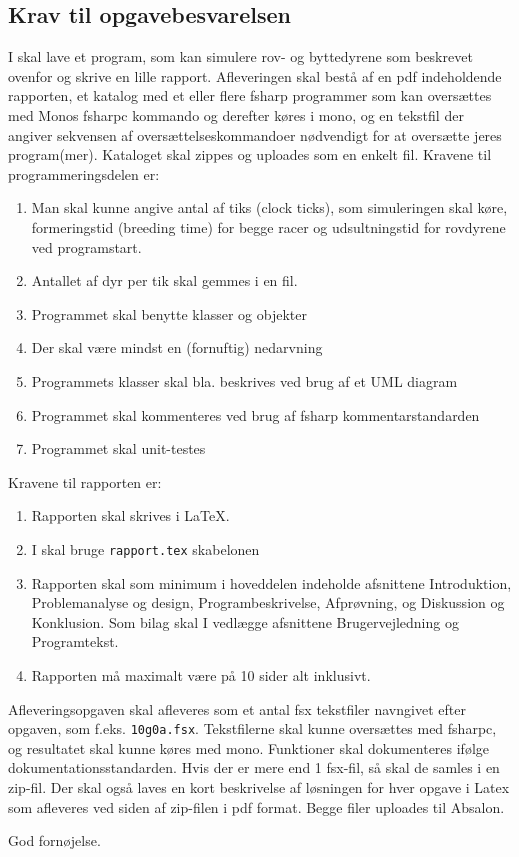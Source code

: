 \documentclass[a4paper,12pt]{article}
\begin{document}
\subsection*{Krav til opgavebesvarelsen}
I skal lave et program, som kan simulere rov- og byttedyrene som beskrevet ovenfor og skrive en lille rapport. Afleveringen skal bestå af en pdf indeholdende rapporten, et katalog med et eller flere fsharp programmer som kan oversættes med Monos fsharpc kommando og derefter køres i mono, og en tekstfil der angiver sekvensen af oversættelseskommandoer nødvendigt for at oversætte jeres program(mer). Kataloget skal zippes og uploades som en enkelt fil. Kravene til programmeringsdelen er:
\begin{enumerate}
\item Man skal kunne angive antal af tiks (clock ticks), som simuleringen skal køre, formeringstid (breeding time) for begge racer og udsultningstid for rovdyrene ved programstart.
\item Antallet af dyr per tik skal gemmes i en fil.
\item Programmet skal benytte klasser og objekter
\item Der skal være mindst en (fornuftig) nedarvning
\item Programmets klasser skal bla. beskrives ved brug af et UML diagram
\item Programmet skal kommenteres ved brug af fsharp kommentarstandarden
\item Programmet skal unit-testes
\end{enumerate}
Kravene til rapporten er:
\begin{enumerate}[resume]
\item Rapporten skal skrives i \LaTeX.
\item I skal bruge \texttt{rapport.tex} skabelonen
\item Rapporten skal som minimum i hoveddelen indeholde afsnittene Introduktion, Problemanalyse og design, Programbeskrivelse, Afprøvning, og Diskussion og Konklusion. Som bilag skal I vedlægge afsnittene Brugervejledning og Programtekst.
\item Rapporten må maximalt være på 10 sider alt inklusivt.
\end{enumerate}
 
Afleveringsopgaven skal afleveres som et antal fsx tekstfiler navngivet efter opgaven, som f.eks. \lstinline!10g0a.fsx!. Tekstfilerne skal kunne oversættes med fsharpc, og resultatet skal kunne køres med mono. Funktioner skal dokumenteres ifølge dokumentationsstandarden. Hvis der er mere end 1 fsx-fil, så skal de samles i en zip-fil. Der skal også laves en kort beskrivelse af løsningen for hver opgave i Latex som afleveres ved siden af zip-filen i pdf format. Begge filer uploades til Absalon.

\flushright God fornøjelse.
\end{document}
